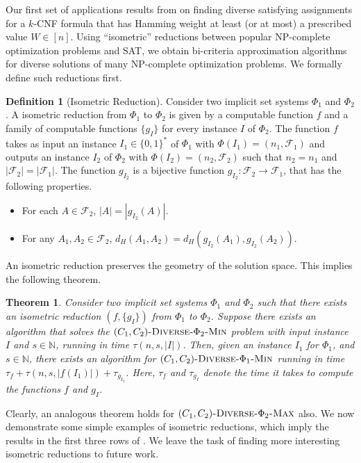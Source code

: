 \documentclass[11pt, letterpaper]{article}
\newtheorem{theorem}{Theorem}
\theoremstyle{definition}
\newtheorem{definition}{Definition}
\newcommand{\calf}{\mathcal{F}}
\newcommand{\IN}{\ensuremath{\mathbb{N}}}
\begin{document}
Our first set of applications results from  on finding diverse satisfying assignments for a $k$-CNF formula that has Hamming weight at least (or at most) a prescribed value $W \in [n]$. Using ``isometric'' reductions between popular NP-complete optimization problems and SAT, we obtain bi-criteria approximation algorithms for diverse solutions of many NP-complete optimization problems. We formally define such reductions first.
\begin{definition}[Isometric Reduction]
    Consider two implicit set systems $\Phi_1$ and $\Phi_2$. A isometric reduction from $\Phi_1$ to $\Phi_2$ is given by a computable function $f$ and a family of computable functions $\{g_I \}$ for every instance $I$ of $\Phi_2$. The function $f$ takes as input an instance $I_1 \in \{0,1\}^*$ of $\Phi_1$ with $\Phi(I_1)=\left(n_1, \mathcal{F}_1\right)$ and outputs an instance $I_2$ of $\Phi_2$ with $\Phi(I_2)=\left(n_2,\calf_2\right)$ such that $n_2=n_1$ and $|\calf_2|=|\calf_1|$. The function $g_{I_2}$ is a bijective function $g_{I_2}: \calf_2 \to \calf_1$, that has the following properties.
    \begin{itemize}
        \item For each $A \in \mathcal{F}_2$, $|A|=|g_{I_2}(A)|$.
        \item For any $A_1, A_2 \in \mathcal{F}_2$, $d_H(A_1, A_2)= d_H(g_{I_2}(A_1), g_{I_2}(A_2))$.
    \end{itemize}
\end{definition}

An isometric reduction preserves the geometry of the solution space. This implies the following theorem.

\begin{theorem} \label{thm:isometricreduction}
    Consider two implicit set systems $\Phi_1$ and $\Phi_2$ such that there exists an isometric reduction $\left( f, \{g_I\}\right)$ from $\Phi_1$ to $\Phi_2$. Suppose there exists an algorithm that solves the $(C_1, C_2)\textsc{-Diverse-}\Phi_2\textsc{-Min}$ problem with input instance $I$ and $s \in \IN$, running in time $\tau(n,s,|I|)$. Then, given an instance $I_1$ for $\Phi_1$, and $s \in \IN$, there exists an algorithm for $(C_1, C_2)\textsc{-Diverse-}\Phi_1\textsc{-Min}$ running in time $\tau_f+ \tau(n, s, |f(I_1)|)+\tau_{g_{I_{2}}}$. Here, $\tau_f$ and $\tau_{g_{I}}$ denote the time it takes to compute the functions $f$ and $g_I$.     
\end{theorem}

\noindent
Clearly, an analogous theorem holds for $(C_1, C_2)\textsc{-Diverse-}\Phi_2\textsc{-Max}$ also. We now demonstrate some simple examples of isometric reductions, which imply the results in the first three rows of . We leave the task of finding more interesting isometric reductions to future work. 
\end{document}
